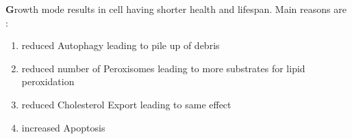\textbf Growth mode results in cell having shorter health and lifespan. Main reasons are :
\begin{enumerate}
\item reduced Autophagy leading to pile up of debris
\item reduced number of Peroxisomes leading to more substrates for lipid peroxidation
\item reduced Cholesterol Export leading to same effect
\item increased Apoptosis
\end{enumerate}